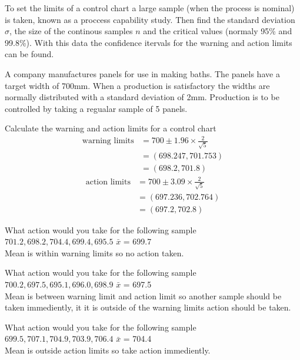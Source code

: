         \noindent
        To set the limits of a control chart a large sample (when the process is nominal) is taken, known as a proccess capability study. Then find the standard deviation $\sigma$, the size of the continous samples $n$ and the critical values (normaly 95\% and 99.8\%). With this data the confidence itervals for the warning and action limits can be found.

        \begin{example}
        {
            A company manufactures panels for use in making baths. The panels have a target width of 700mm. When a production is satisfactory the widths are normally distributed with a standard deviation of 2mm. Production is to be controlled by taking a regualar sample of 5 panels.
        }

        \begin{step}{Calculate the warning and action limits for a control chart}
        \begin{align*}
        \text{warning limits} &= 700 \pm 1.96 \times \frac{2}{\sqrt{5}}\\
        &= (698.247, 701.753)\\
        &= (698.2, 701.8)
        \end{align*}
        \begin{align*}
        \text{action limits} &= 700 \pm 3.09 \times \frac{2}{\sqrt{5}}\\
        &= (697.236, 702.764) \\
        &= (697.2, 702.8)
        \end{align*}
        \end{step}

        \begin{step}{What action would you take for the following sample $701.2, 698.2, 704.4, 699.4, 695.5$}
        $\bar{x}$ = 699.7\\
        Mean is within warning limits so no action taken.
        \end{step}

        \begin{step}{What action would you take for the following sample $700.2, 697.5, 695.1, 696.0, 698.9$}
        $\bar{x}$ = 697.5\\
        Mean is between warning limit and action limit so another sample should be taken immediently, it it is outside of the warning limits action should be taken.
        \end{step}

        \begin{step}{What action would you take for the following sample $699.5, 707.1, 704.9, 703.9, 706.4$}
        $\bar{x}$ = 704.4\\
        Mean is outside action limits so take action immediently.
        \end{step}

        \end{example}

